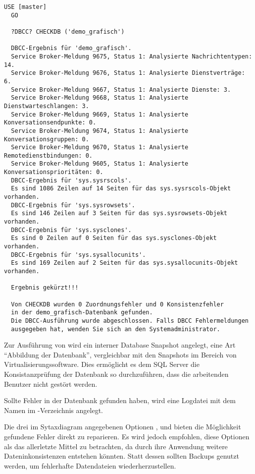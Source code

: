           \begin{lstlisting}[language=ms_sql,caption={Konsistenzprüfung einer
          Datenbank mit DBCC},label=admin03_30]
  USE [master]
  GO
  
  ?DBCC? CHECKDB ('demo_grafisch')
  
  DBCC-Ergebnis für 'demo_grafisch'.
  Service Broker-Meldung 9675, Status 1: Analysierte Nachrichtentypen: 14.
  Service Broker-Meldung 9676, Status 1: Analysierte Dienstverträge: 6.
  Service Broker-Meldung 9667, Status 1: Analysierte Dienste: 3.
  Service Broker-Meldung 9668, Status 1: Analysierte Dienstwarteschlangen: 3.
  Service Broker-Meldung 9669, Status 1: Analysierte Konversationsendpunkte: 0.
  Service Broker-Meldung 9674, Status 1: Analysierte Konversationsgruppen: 0.
  Service Broker-Meldung 9670, Status 1: Analysierte Remotedienstbindungen: 0.
  Service Broker-Meldung 9605, Status 1: Analysierte Konversationsprioritäten: 0.
  DBCC-Ergebnis für 'sys.sysrscols'.
  Es sind 1086 Zeilen auf 14 Seiten für das sys.sysrscols-Objekt vorhanden.
  DBCC-Ergebnis für 'sys.sysrowsets'.
  Es sind 146 Zeilen auf 3 Seiten für das sys.sysrowsets-Objekt vorhanden.
  DBCC-Ergebnis für 'sys.sysclones'.
  Es sind 0 Zeilen auf 0 Seiten für das sys.sysclones-Objekt vorhanden.
  DBCC-Ergebnis für 'sys.sysallocunits'.
  Es sind 169 Zeilen auf 2 Seiten für das sys.sysallocunits-Objekt vorhanden.
  
  Ergebnis gekürzt!!!
  
  Von CHECKDB wurden 0 Zuordnungsfehler und 0 Konsistenzfehler 
  in der demo_grafisch-Datenbank gefunden.
  Die DBCC-Ausführung wurde abgeschlossen. Falls DBCC Fehlermeldungen
  ausgegeben hat, wenden Sie sich an den Systemadministrator.
          \end{lstlisting}
          Zur Ausführung von  wird ein interner Database
          Snapshot angelegt, eine Art \enquote{Abbildung der Datenbank},
          vergleichbar mit den Snapshots im Bereich von Virtualisierungssoftware.
          Dies ermöglicht es dem SQL Server die Konsistanzprüfung der Datenbank so
          durchzuführen, dass die arbeitenden Benutzer nicht gestört werden.
          
          Sollte  Fehler in der Datenbank gefunden haben,
          wird eine Logdatei mit dem Namen  im
          -Verzeichnis angelegt.
        
          Die drei im Sytaxdiagram angegebenen Optionen
          ,  und
           bieten die Möglichkeit gefundene Fehler
          direkt zu reparieren. Es wird jedoch empfohlen, diese Optionen als das
          allerletzte Mittel zu betrachten, da durch ihre Anwendung weitere
          Dateninkonsistenzen entstehen könnten. Statt dessen sollten Backups
          genutzt werden, um fehlerhafte Datendateien wiederherzustellen.
